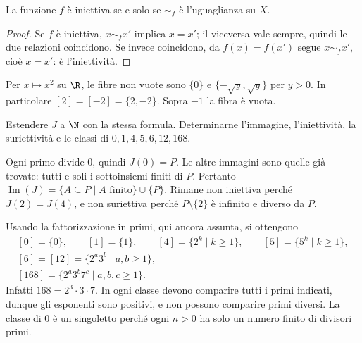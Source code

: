 \begin{schema}
\end{schema}

\begin{proposizione}
La funzione $f$ è iniettiva se e solo se $\sim_f$ è l'uguaglianza su $X$.
\end{proposizione}
\begin{proof}
Se $f$ è iniettiva, $x\sim_f x'$ implica $x=x'$; il viceversa vale sempre, quindi le due relazioni coincidono. Se invece coincidono, da $f(x)=f(x')$ segue $x\sim_f x'$, cioè $x=x'$: è l'iniettività.
\end{proof}

\begin{esempio}
Per $x\mapsto x^2$ su $\R$, le fibre non vuote sono $\{0\}$ e $\{-\sqrt y,\sqrt y\}$ per $y>0$. In particolare $[2]=[-2]=\{2,-2\}$. Sopra $-1$ la fibra è vuota.
\end{esempio}

\begin{esercizio}
Estendere $J$ a $\N$ con la stessa formula. Determinarne l'immagine, l'iniettività, la suriettività e le classi di $0,1,4,5,6,12,168$.
\end{esercizio}
\begin{svolgimento}
Ogni primo divide $0$, quindi $J(0)=P$. Le altre immagini sono quelle già trovate: tutti e soli i sottoinsiemi finiti di $P$. Pertanto $\operatorname{Im}(J)=\{A\subseteq P\mid A\text{ finito}\}\cup\{P\}$. Rimane non iniettiva perché $J(2)=J(4)$, e non suriettiva perché $P\setminus\{2\}$ è infinito e diverso da $P$.

Usando la fattorizzazione in primi, qui ancora assunta, si ottengono
\[
\begin{gathered}
[0]=\{0\},\qquad [1]=\{1\},\qquad [4]=\{2^k\mid k\ge1\},\qquad
[5]=\{5^k\mid k\ge1\},\\
[6]=[12]=\{2^a3^b\mid a,b\ge1\},\\
[168]=\{2^a3^b7^c\mid a,b,c\ge1\}.
\end{gathered}
\]
Infatti $168=2^3\cdot3\cdot7$. In ogni classe devono comparire tutti i primi indicati, dunque gli esponenti sono positivi, e non possono comparire primi diversi. La classe di $0$ è un singoletto perché ogni $n>0$ ha solo un numero finito di divisori primi.
\end{svolgimento}

